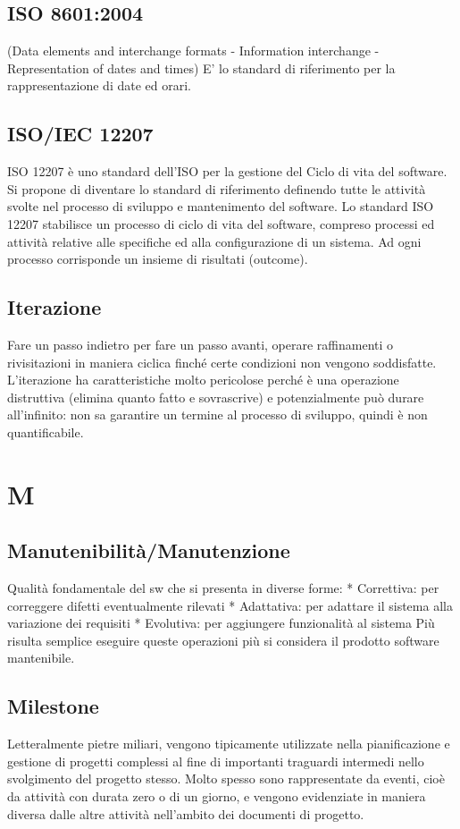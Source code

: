 \documentclass[a4paper]{report}
\newcommand{\mychapter}[2]{
	\setcounter{chapter}{#1}
	\setcounter{section}{0}
	\setcounter{subsection}{1}
	\chapter*{#2}
	\addcontentsline{toc}{chapter}{#2}
}
\begin{document}
\section{ISO 8601:2004} (Data elements and interchange formats - Information interchange - Representation of dates and times) E' lo standard di riferimento per la rappresentazione di date ed orari.
\section{ISO/IEC 12207}  ISO 12207 è uno standard dell'ISO per la gestione del Ciclo di vita del software. Si propone di diventare lo standard di riferimento definendo tutte le attività svolte nel processo di sviluppo e mantenimento del software. Lo standard ISO 12207 stabilisce un processo di ciclo di vita del software, compreso processi ed attività relative alle specifiche ed alla configurazione di un sistema. Ad ogni processo corrisponde un insieme di risultati (outcome).
\section{Iterazione} Fare un passo indietro per fare un passo avanti, operare raffinamenti o rivisitazioni in maniera ciclica finché certe condizioni non vengono soddisfatte. L’iterazione ha caratteristiche molto pericolose perché è una operazione distruttiva (elimina quanto fatto e sovrascrive) e potenzialmente può durare all'infinito: non sa garantire un termine al processo di sviluppo, quindi è non quantificabile.

\mychapter{9}{M}

\section{Manutenibilità/Manutenzione} Qualità fondamentale del sw che si presenta in diverse forme:
  * Correttiva: per correggere difetti eventualmente rilevati
  * Adattativa: per adattare il sistema alla variazione dei requisiti
  * Evolutiva: per aggiungere funzionalità al sistema
Più risulta semplice eseguire queste operazioni più si considera il prodotto software mantenibile.
\section{Milestone} Letteralmente pietre miliari, vengono tipicamente utilizzate nella pianificazione e gestione di progetti complessi al fine di importanti traguardi intermedi nello svolgimento del progetto stesso. Molto spesso sono rappresentate da eventi, cioè da attività con durata zero o di un giorno, e vengono evidenziate in maniera diversa dalle altre attività nell’ambito dei documenti di progetto.
\end{document}
